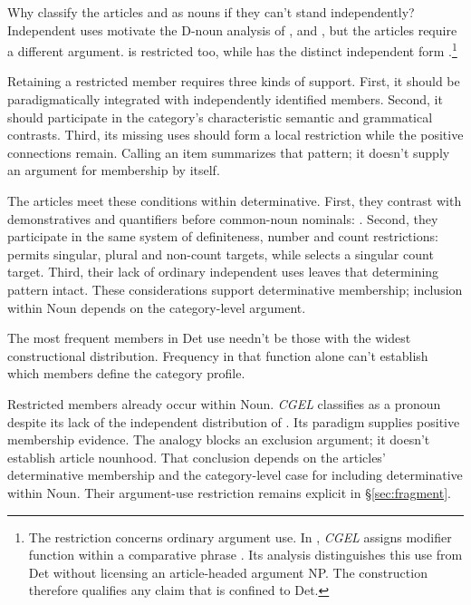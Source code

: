 \documentclass[12pt]{article}
\begin{document}
Why classify the articles  and  as nouns if they can't stand independently? Independent uses motivate the D-noun analysis of ,  and , but the articles require a different argument.  is restricted too, while  has the distinct independent form  \citep[371--372, 410--411]{huddleston2002}.\footnote{The restriction concerns ordinary argument use. In , \textit{CGEL} assigns  modifier function within a comparative phrase \citep[1131--1132, 1135--1136]{huddleston2002}. Its analysis distinguishes this use from Det without licensing an article-headed argument NP. The construction therefore qualifies any claim that  is confined to Det.}

Retaining a restricted member requires three kinds of support. First, it should be paradigmatically integrated with independently identified members. Second, it should participate in the category's characteristic semantic and grammatical contrasts. Third, its missing uses should form a local restriction while the positive connections remain. Calling an item  summarizes that pattern; it doesn't supply an argument for membership by itself.

The articles meet these conditions within determinative. First, they contrast with demonstratives and quantifiers before common-noun nominals: . Second, they participate in the same system of definiteness, number and count restrictions:  permits singular, plural and non-count targets, while  selects a singular count target. Third, their lack of ordinary independent uses leaves that determining pattern intact. These considerations support determinative membership; inclusion within Noun depends on the category-level argument.

The most frequent members in Det use needn't be those with the widest constructional distribution. Frequency in that function alone can't establish which members define the category profile.

Restricted members already occur within Noun. \textit{CGEL} classifies  as a pronoun despite its lack of the independent distribution of  \citep[470--471]{huddleston2002}. Its paradigm supplies positive membership evidence. The analogy blocks an exclusion argument; it doesn't establish article nounhood. That conclusion depends on the articles' determinative membership and the category-level case for including determinative within Noun. Their argument-use restriction remains explicit in §\ref{sec:fragment}.
\end{document}
